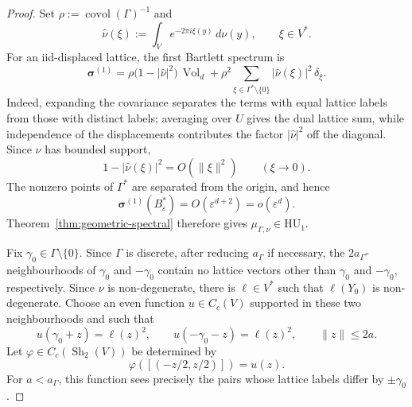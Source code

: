 \documentclass[11pt,reqno,a4paper]{amsart}
\numberwithin{equation}{section}
\theoremstyle{compact}
\theoremstyle{definition}
\theoremstyle{definition}
\newcommand{\HU}{\mathrm{HU}}
\newcommand{\Vol}{\operatorname{Vol}}
\newcommand{\Sh}{\operatorname{Sh}}
\begin{document}
\begin{proof}
Set $\rho:=\operatorname{covol}(\Gamma)^{-1}$ and
\[
  \widehat\nu(\xi):=\int_V e^{-2\pi i\xi(y)}\,d\nu(y),
  \qquad \xi\in V^*.
\]
For an iid-displaced lattice, the first Bartlett spectrum is
\begin{equation}\label{eq:perturbed-lattice-first-spectrum}
  \boldsymbol\sigma^{(1)}
  =\rho\bigl(1-|\widehat\nu|^2\bigr)\,\Vol_d
   +\rho^2\sum_{\xi\in\Gamma^*\setminus\{0\}}
      |\widehat\nu(\xi)|^2\,\delta_\xi .
\end{equation}
Indeed, expanding the covariance separates the terms with equal lattice
labels from those with distinct labels; averaging over $U$ gives the dual
lattice sum, while independence of the displacements contributes the factor
$|\widehat\nu|^2$ off the diagonal.
Since $\nu$ has bounded support,
\begin{equation}\label{eq:perturbed-lattice-characteristic-small-frequency}
  1-|\widehat\nu(\xi)|^2=O(\|\xi\|^2)
  \qquad(\xi\to0).
\end{equation}
The nonzero points of $\Gamma^*$ are separated from the origin, and hence
\[
  \boldsymbol\sigma^{(1)}(B_\varepsilon^*)
  =O(\varepsilon^{d+2})=o(\varepsilon^d).
\]
Theorem~\ref{thm:geometric-spectral} therefore gives
$\mu_{\Gamma,\nu}\in\HU_1$.

Fix $\gamma_0\in\Gamma\setminus\{0\}$.  Since $\Gamma$ is discrete, after
reducing $a_\Gamma$ if necessary, the $2a_\Gamma$-neighbourhoods of
$\gamma_0$ and $-\gamma_0$ contain no lattice vectors other than
$\gamma_0$ and $-\gamma_0$, respectively.  Since $\nu$ is non-degenerate,
there is $\ell\in V^*$ such that $\ell(Y_0)$ is non-degenerate.  Choose an
even function $u\in C_c(V)$ supported in these two neighbourhoods and such
that
\begin{equation}\label{eq:perturbed-lattice-shape-test}
  u(\gamma_0+z)=\ell(z)^2,
  \qquad
  u(-\gamma_0-z)=\ell(z)^2,
  \qquad \|z\|\leq2a.
\end{equation}
Let $\varphi\in C_c(\Sh_2(V))$ be determined by
\[
  \varphi([(-z/2,z/2)])=u(z).
\]
For $a<a_\Gamma$, this function sees precisely the pairs whose lattice
labels differ by $\pm\gamma_0$.


\end{proof}
\end{document}
